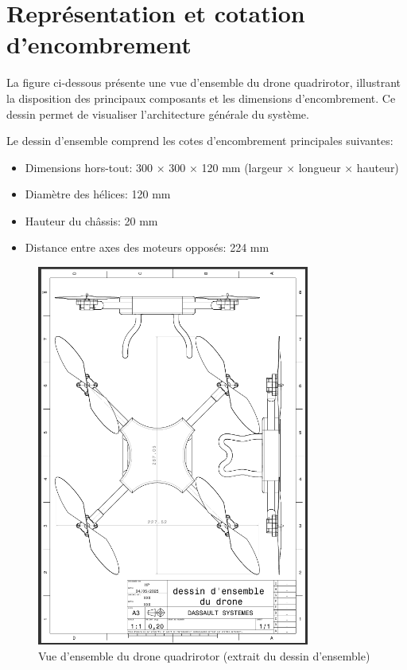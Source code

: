 \documentclass[a4paper,12pt]{report}
\begin{document}
\section{Représentation et cotation d'encombrement}

La figure ci-dessous présente une vue d'ensemble du drone quadrirotor, illustrant la disposition des principaux composants et les dimensions d'encombrement. Ce dessin permet de visualiser l'architecture générale du système.

Le dessin d'ensemble comprend les cotes d'encombrement principales suivantes:
    \begin{itemize}
    \item Dimensions hors-tout: 300 × 300 × 120 mm (largeur × longueur × hauteur)
    \item Diamètre des hélices: 120 mm
    \item Hauteur du châssis: 20 mm
    \item Distance entre axes des moteurs opposés: 224 mm
\end{itemize}

\begin{figure}[H]
    \centering
    \includegraphics[width=0.8\textwidth]{images/dessin_ensemble_drone.png}
    \caption{Vue d'ensemble du drone quadrirotor (extrait du dessin d'ensemble)}
    \label{fig:dessin_ensemble_drone}
\end{figure}
\end{document}
